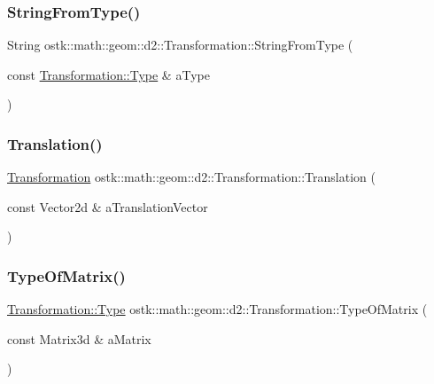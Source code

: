 \subsubsection{\texorpdfstring{String\+From\+Type()}{StringFromType()}}
{\footnotesize\ttfamily String ostk\+::math\+::geom\+::d2\+::\+Transformation\+::\+String\+From\+Type (\begin{DoxyParamCaption}\item[{const \hyperlink{classostk_1_1math_1_1geom_1_1d2_1_1_transformation_ad98045429a325b64040ef419cb68bea9}{Transformation\+::\+Type} \&}]{a\+Type }\end{DoxyParamCaption})\hspace{0.3cm}{\ttfamily [static]}}

\mbox{\label{classostk_1_1math_1_1geom_1_1d2_1_1_transformation_aa8b8907c98ee5704c3356324c6c83f2b}} 
\subsubsection{\texorpdfstring{Translation()}{Translation()}}
{\footnotesize\ttfamily \hyperlink{classostk_1_1math_1_1geom_1_1d2_1_1_transformation}{Transformation} ostk\+::math\+::geom\+::d2\+::\+Transformation\+::\+Translation (\begin{DoxyParamCaption}\item[{const Vector2d \&}]{a\+Translation\+Vector }\end{DoxyParamCaption})\hspace{0.3cm}{\ttfamily [static]}}

\mbox{\label{classostk_1_1math_1_1geom_1_1d2_1_1_transformation_a44941f94239e03e1ee17bced99cbf48c}} 
\subsubsection{\texorpdfstring{Type\+Of\+Matrix()}{TypeOfMatrix()}}
{\footnotesize\ttfamily \hyperlink{classostk_1_1math_1_1geom_1_1d2_1_1_transformation_ad98045429a325b64040ef419cb68bea9}{Transformation\+::\+Type} ostk\+::math\+::geom\+::d2\+::\+Transformation\+::\+Type\+Of\+Matrix (\begin{DoxyParamCaption}\item[{const Matrix3d \&}]{a\+Matrix }\end{DoxyParamCaption})\hspace{0.3cm}{\ttfamily [static]}}

